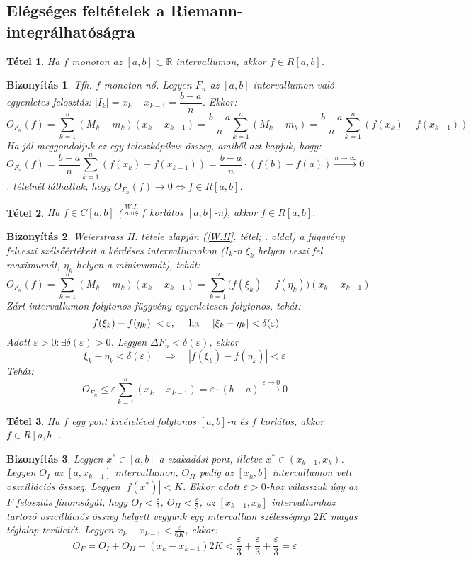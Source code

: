 \documentclass[a4paper,12pt,twoside]{book}
\newtheorem{tetel}{Tétel}[chapter]
\theoremstyle{break}
\newtheorem{biz}{Bizonyítás}[chapter]
\theoremstyle{plain}
\begin{document}
\subsection{Elégséges feltételek a Riemann-integrálhatóságra}

\begin{tetel}
 Ha $f$ monoton az $[a,b]\subset\mathbb{R}$ intervallumon, akkor $f\in R[a,b]$.
\end{tetel}
\begin{biz}
 Tfh. $f$ monoton nő. Legyen $F_n$ az $[a,b]$ intervallumon való egyenletes felosztás: $|I_k|=x_k-x_{k-1}=\dfrac{b-a}{n}$. Ekkor:
\[O_{F_n}(f) = \sum^{n}_{k=1} (M_k - m_k)(x_k-x_{k-1}) = \dfrac{b-a}{n}\sum^{n}_{k=1} (M_k - m_k) = \dfrac{b-a}{n}\sum^{n}_{k=1} (f(x_k) - f(x_{k-1}))\]
Ha jól meggondoljuk ez egy teleszkópikus összeg, amiből azt kapjuk, hogy:
\[O_{F_n}(f) = \dfrac{b-a}{n}\sum^{n}_{k=1} (f(x_k) - f(x_{k-1})) = \dfrac{b-a}{n}\cdot(f(b)-f(a)) \xrightarrow{n\to \infty} 0 \]
. tételnél láthattuk, hogy $O_{F_n}(f) \to 0 \Leftrightarrow f\in R[a,b]$.
\end{biz}

\begin{tetel}
 Ha $f\in C[a,b]$ ($\overset{W. I.}{\rightsquigarrow} f$ korlátos $[a,b]$-n), akkor $f\in R[a,b]$.
\end{tetel}
\begin{biz}
 Weierstrass II. tétele alapján (\ref{W.II}. tétel; \pageref{W.II}. oldal) a függvény felveszi szélsőértékeit a kérdéses intervallumokon ($I_k$-n $\xi_k$ helyen veszi fel maximumát, $\eta_k$ helyen a minimumát), tehát:
 \[O_{F_n}(f) = \sum^{n}_{k=1} (M_k - m_k)(x_k-x_{k-1}) = \sum^{n}_{k=1} \Big(f(\xi_k) - f(\eta_k)\Big)(x_k-x_{k-1})\]
 Zárt intervallumon folytonos függvény egyenletesen folytonos, tehát:
  \[|f(\xi_k) - f(\eta_k)| < \varepsilon, \quad \hbox{ ha } \quad |\xi_k - \eta_k|<\delta(\varepsilon)\]
 Adott $\varepsilon>0:\exists \delta(\varepsilon) > 0$. Legyen $\Delta F_n < \delta(\varepsilon)$, ekkor
  \[\xi_k-\eta_k < \delta(\varepsilon) \quad \Rightarrow \quad |f(\xi_k)-f(\eta_k)| < \varepsilon\]
 Tehát:
  \[O_{F_n} \leqslant \varepsilon \sum^{n}_{k=1}(x_k-x_{k-1}) = \varepsilon\cdot(b-a) \xrightarrow{\varepsilon\to 0} 0\]
\end{biz}

\begin{tetel}
 Ha $f$ egy pont kivételével folytonos $[a,b]$-n és $f$ korlátos, akkor $f\in R[a,b]$.
\end{tetel}
\begin{biz}
 Legyen $x^*\in [a,b]$ a szakadási pont, illetve $x^*\in (x_{k-1}, x_k)$. Legyen $O_I$ az $[a,x_{k-1}]$ intervallumon, $O_{II}$ pedig az $[x_k, b]$ intervallumon vett oszcillációs összeg. Legyen $|f(x^*)|<K$. Ekkor adott $\varepsilon>0$-hoz válasszuk úgy az $F$ felosztás finomságát, hogy $O_I < \frac{\varepsilon}{3}$, $O_{II} < \frac{\varepsilon}{3}$, az $[x_{k-1}, x_{k}]$ intervallumhoz tartozó oszcillációs összeg helyett vegyünk egy intervallum szélességnyi $2K$ magas téglalap területét. Legyen $x_k-x_{k-1}<\frac{\varepsilon}{6K}$, ekkor:
  \[O_F = O_I+O_{II}+(x_{k}-x_{k-1})2K < \frac{\varepsilon}{3}+\frac{\varepsilon}{3}+\frac{\varepsilon}{3} = \varepsilon\]
\end{biz}
\end{document}
